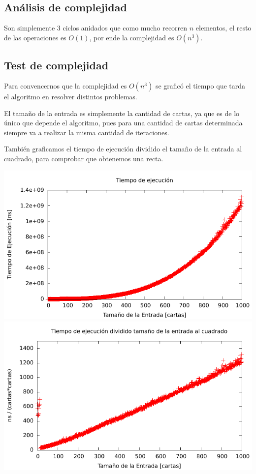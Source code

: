 \subsection{An\'alisis de complejidad}
Son simplemente 3 ciclos anidados que como mucho recorren $n$ elementos, el resto de las operaciones es $O(1)$, por
ende la complejidad es $O(n^3)$.

\subsection{Test de complejidad}
Para convencernos que la complejidad es $O(n^3)$ se graficó el tiempo que tarda el algoritmo en resolver distintos problemas.

El tamaño de la entrada es simplemente la cantidad de cartas, ya que es de lo único que depende el algoritmo, pues para una cantidad de
cartas determinada siempre va a realizar la misma cantidad de iteraciones.

También graficamos el tiempo de ejecución dividido el tamaño de la entrada al cuadrado, para comprobar que obtenemos una recta.

\includegraphics[width=\textwidth]{ej1/cubico.pdf}
\includegraphics[width=\textwidth]{ej1/lineal.pdf}

